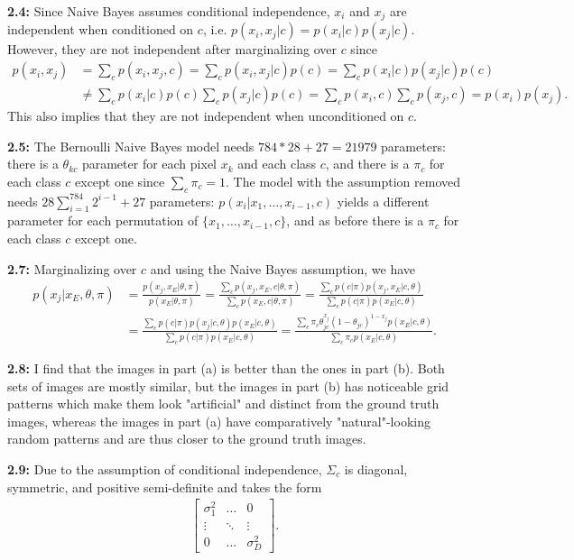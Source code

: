 \documentclass[12pt]{article}
\begin{document}
\textbf{2.4:} Since Naive Bayes assumes conditional independence, $x_i$ and $x_j$ are independent when conditioned on $c$, i.e. $p(x_i,x_j|c) = p(x_i|c)p(x_j|c)$. However, they are not independent after marginalizing over $c$ since \begin{align*}
    p(x_i,x_j) &= \sum_c p(x_i,x_j,c) = \sum_c p(x_i,x_j|c)p(c) = \sum_c p(x_i|c)p(x_j|c)p(c)\\
    &\neq \sum_c p(x_i|c)p(c)\sum_c p(x_j|c)p(c) = \sum_c p(x_i,c)\sum_c p(x_j,c) = p(x_i)p(x_j).
\end{align*} This also implies that they are not independent when unconditioned on $c$.

\textbf{2.5:} The Bernoulli Naive Bayes model needs $784*28+27=21979$ parameters: there is a $\theta_{kc}$ parameter for each pixel $x_k$ and each class $c$, and there is a $\pi_c$ for each class $c$ except one since $\sum_c \pi_c=1$. The model with the assumption removed needs $28\sum_{i=1}^{784} 2^{i-1} + 27$ parameters: $p(x_i|x_1,\ldots,x_{i-1},c)$ yields a different parameter for each permutation of $\{x_1,\ldots,x_{i-1},c\}$, and as before there is a $\pi_c$ for each class $c$ except one.

\textbf{2.7:} Marginalizing over $c$ and using the Naive Bayes assumption, we have \begin{align*}
    p(x_j|x_E,\theta,\pi) &= \frac{p(x_j,x_E|\theta,\pi)}{p(x_E|\theta,\pi)} = \frac{\sum_c p(x_j,x_E,c|\theta,\pi)}{\sum_c p(x_E,c|\theta,\pi)} = \frac{\sum_c p(c|\pi)p(x_j,x_E|c,\theta)}{\sum_c p(c|\pi)p(x_E|c,\theta)}\\
    &= \frac{\sum_c p(c|\pi)p(x_j|c,\theta)p(x_E|c,\theta)}{\sum_c p(c|\pi)p(x_E|c,\theta)} = \frac{\sum_c\pi_c\theta_{jc}^{x_j}(1-\theta_{jc})^{1-x_j}p(x_E|c,\theta)}{\sum_c\pi_c p(x_E|c,\theta)}.
\end{align*}

\textbf{2.8:} I find that the images in part (a) is better than the ones in part (b). Both sets of images are mostly similar, but the images in part (b) has noticeable grid patterns which make them look "artificial" and distinct from the ground truth images, whereas the images in part (a) have comparatively "natural"-looking random patterns and are thus closer to the ground truth images.

\textbf{2.9:} Due to the assumption of conditional independence, $\Sigma_c$ is diagonal, symmetric, and positive semi-definite and takes the form \begin{align*}
    \begin{bmatrix} \sigma_1^2 & \ldots & 0 \\ \vdots & \ddots & \vdots \\ 0 & \ldots & \sigma_D^2 \end{bmatrix}.
\end{align*}
\end{document}
